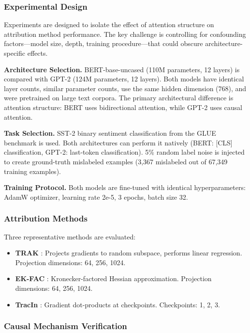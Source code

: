 
\subsubsection{Experimental Design}

Experiments are designed to isolate the effect of attention structure on attribution method performance. The key challenge is controlling for confounding factors---model size, depth, training procedure---that could obscure architecture-specific effects.

\textbf{Architecture Selection.} BERT-base-uncased (110M parameters, 12 layers) is compared with GPT-2 (124M parameters, 12 layers). Both models have identical layer counts, similar parameter counts, use the same hidden dimension (768), and were pretrained on large text corpora. The primary architectural difference is attention structure: BERT uses bidirectional attention, while GPT-2 uses causal attention.

\textbf{Task Selection.} SST-2 binary sentiment classification from the GLUE benchmark is used. Both architectures can perform it natively (BERT: [CLS] classification, GPT-2: last-token classification). 5\% random label noise is injected to create ground-truth mislabeled examples (3,367 mislabeled out of 67,349 training examples).

\textbf{Training Protocol.} Both models are fine-tuned with identical hyperparameters: AdamW optimizer, learning rate 2e-5, 3 epochs, batch size 32.

\subsubsection{Attribution Methods}

Three representative methods are evaluated:

\begin{itemize}
\item \textbf{TRAK} \citep{park2023trak}: Projects gradients to random subspace, performs linear regression. Projection dimensions: {64, 256, 1024}.
\item \textbf{EK-FAC} \citep{grosse2023studying}: Kronecker-factored Hessian approximation. Projection dimensions: {64, 256, 1024}.
\item \textbf{TracIn} \citep{pruthi2020estimating}: Gradient dot-products at checkpoints. Checkpoints: {1, 2, 3}.
\end{itemize}

\subsubsection{Causal Mechanism Verification}

